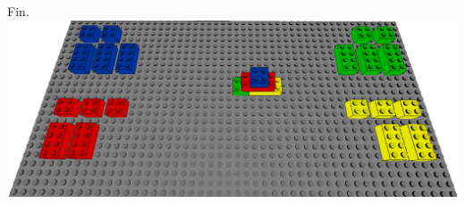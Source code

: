 \documentclass[aspectratio=169]{beamer}
\begin{document}
\begin{frame}
    Fin.
    \vfill
  \includegraphics[width=\linewidth]{end.png}
\end{frame}
\end{document}
